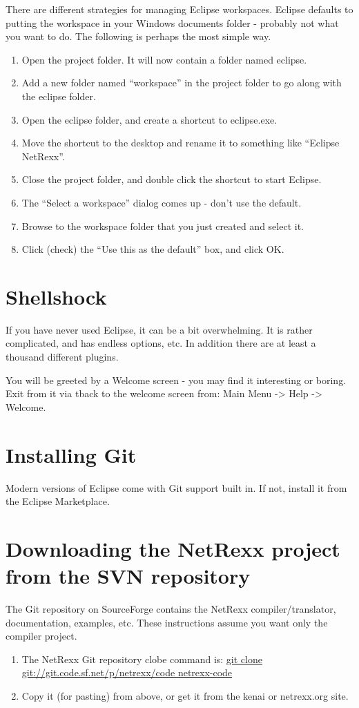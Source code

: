 There are different strategies for managing Eclipse workspaces.
Eclipse defaults to putting the workspace in your Windows documents
folder - probably not what you want to do.  The following is perhaps
the most simple way.
\begin{enumerate}
\item Open the project folder.  It will now contain a folder named
   eclipse.
\item Add a new folder named ``workspace'' in the project folder to go
along with the eclipse folder.
\item Open the eclipse folder, and create a shortcut to eclipse.exe.
\item Move the shortcut to the desktop and rename it to something like
   ``Eclipse NetRexx''.
\item Close the project folder, and double click the shortcut to start
   Eclipse.
\item The ``Select a workspace'' dialog comes up - don't use the default.
\item Browse to the workspace folder that you just created and select it.
\item Click (check) the ``Use this as the default'' box, and click OK.
\end{enumerate}
\section{Shellshock}
 
If you have never used Eclipse, it can be a bit overwhelming.  It is
rather complicated, and has endless options, etc.  In addition there
are at least a thousand different plugins.
 
You will be greeted by a Welcome screen - you may find it interesting
or boring.  Exit from it via tback to the welcome screen from: Main Menu -> Help -> Welcome.
 
\section{Installing Git}
 
Modern versions of Eclipse come with Git support built in. If not,
install it from the Eclipse Marketplace.

\section{Downloading the NetRexx project from the SVN repository}
 
The Git repository on SourceForge contains the NetRexx compiler/translator,
documentation, examples, etc.  These instructions assume you want only
the compiler project.
\begin{enumerate}
\item The NetRexx Git repository clobe command is:
            \url{git clone git://git.code.sf.net/p/netrexx/code netrexx-code}
\item Copy it (for pasting) from above, or get it from the kenai or
            netrexx.org site.
\end{enumerate}

